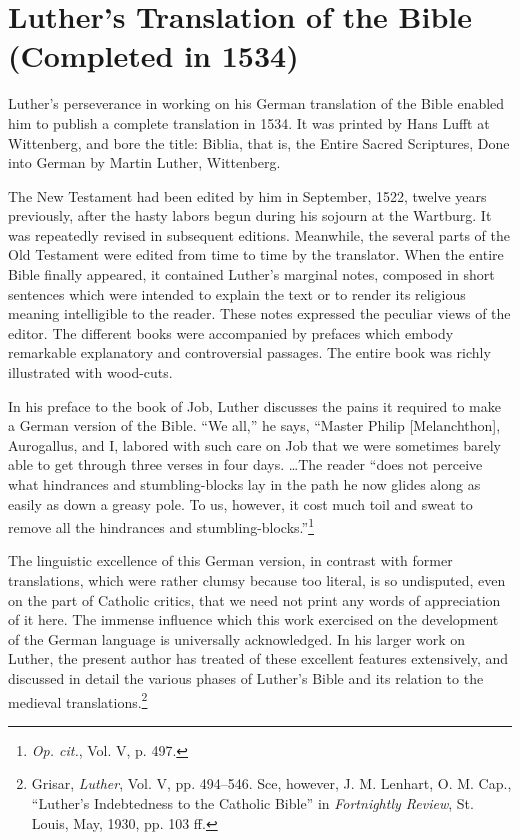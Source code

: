 \section{Luther’s Translation of the Bible (Completed in 1534)}

Luther’s perseverance in working on his German translation of
the Bible enabled him to publish a complete translation in 1534. It
was printed by Hans Lufft at Wittenberg, and bore the title: Biblia,
that is, the Entire Sacred Scriptures, Done into German by Martin
Luther, Wittenberg.

The New Testament had been edited by him in September, 1522,
twelve years previously, after the hasty labors begun during his
sojourn at the Wartburg. It was repeatedly revised in subsequent
editions. Meanwhile, the several parts of the Old Testament were
edited from time to time by the translator. When the entire Bible
finally appeared, it contained Luther’s marginal notes, composed in
short sentences which were intended to explain the text or to render
its religious meaning intelligible to the reader. These notes expressed
the peculiar views of the editor. The different books were accompanied
by prefaces which embody remarkable explanatory and controversial
passages. The entire book was richly illustrated with wood-cuts.

In his preface to the book of Job, Luther discusses the pains it
required to make a German version of the Bible. “We all,” he says,
“Master Philip [Melanchthon], Aurogallus, and I, labored with such
care on Job that we were sometimes barely able to get through three
verses in four days. \dots The reader “does not perceive what hindrances
and stumbling-blocks lay in the path he now glides along as
easily as down a greasy pole. To us, however, it cost much toil and
sweat to remove all the hindrances and stumbling-blocks.”\footnote
{\textit{Op. cit.}, Vol. V, p. 497.}

The linguistic excellence of this German version, in contrast with
former translations, which were rather clumsy because too literal, is
so undisputed, even on the part of Catholic critics, that we need not
print any words of appreciation of it here. The immense influence
which this work exercised on the development of the German language is
universally acknowledged. In his larger work on Luther, the
present author has treated of these excellent features extensively, and
discussed in detail the various phases of Luther’s Bible and its relation
to the medieval translations.\footnote
{Grisar, \textit{Luther}, Vol. V, pp. 494--546. Sce, however, J. M. Lenhart, O. M. Cap.,
``Luther’s Indebtedness to the Catholic Bible'' in \textit{Fortnightly Review}, St. Louis, May, 1930,
pp. 103 ff.}

